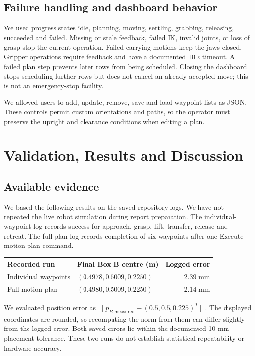 \documentclass[11pt,a4paper]{report}
\begin{document}
\section{Failure handling and dashboard behavior}
We used progress states idle, planning, moving, settling, grabbing, releasing, succeeded and failed. Missing or stale feedback, failed IK, invalid joints, or loss of grasp stop the current operation. Failed carrying motions keep the jaws closed. Gripper operations require feedback and have a documented 10 s timeout. A failed plan step prevents later rows from being scheduled. Closing the dashboard stops scheduling further rows but does not cancel an already accepted move; this is not an emergency-stop facility.

We allowed users to add, update, remove, save and load waypoint lists as JSON. These controls permit custom orientations and paths, so the operator must preserve the upright and clearance conditions when editing a plan.
\chapter{Validation, Results and Discussion}
\section{Available evidence}
We based the following results on the saved repository logs. We have not repeated the live robot simulation during report preparation. The individual-waypoint log records success for approach, grasp, lift, transfer, release and retreat. The full-plan log records completion of six waypoints after one Execute motion plan command.
\begin{center}\begin{tabular}{lp{.37\linewidth}r}\toprule
Recorded run & Final Box B centre (m) & Logged error\\\midrule
Individual waypoints & $(0.4978,0.5009,0.2250)$ &2.39 mm\\
Full motion plan & $(0.4980,0.5009,0.2250)$ &2.14 mm\\\bottomrule
\end{tabular}\end{center}
We evaluated position error as $\|p_{B,\mathrm{measured}}-(0.5,0.5,0.225)^T\|$. The displayed coordinates are rounded, so recomputing the norm from them can differ slightly from the logged error. Both saved errors lie within the documented 10 mm placement tolerance. These two runs do not establish statistical repeatability or hardware accuracy.
\end{document}

